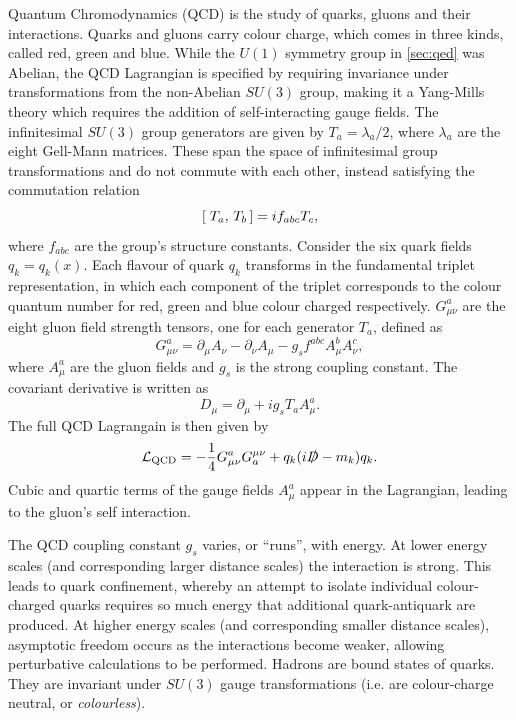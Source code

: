 Quantum Chromodynamics (QCD) is the study of quarks, gluons and their interactions.
Quarks and gluons carry colour charge, which comes in three kinds, called red, green and blue.
While the $U(1)$ symmetry group in \cref{sec:qed} was Abelian, the QCD Lagrangian is specified by requiring invariance under transformations from the non-Abelian $SU(3)$ group, making it a Yang\nobreakdash-Mills theory \cite{PhysRev.96.191} which requires the addition of self-interacting gauge fields.
The infinitesimal $SU(3)$ group generators are given by $T_a = \lambda_a / 2$, where $\lambda_a$ are the eight Gell\nobreakdash-Mann matrices.
These span the space of infinitesimal group transformations and do not commute with each other, instead satisfying the commutation relation
%
\begin{equation}
  [\; T_a,\,T_b\,] = i f_{abc} T_c ,
\end{equation}
%
where $f_{abc}$ are the group's structure constants.
Consider the six quark fields $q_k = q_k(x)$.
Each flavour of quark $q_k$ transforms in the fundamental triplet representation, in which each component of the triplet corresponds to the colour quantum number for red, green and blue colour charged respectively.
$G^{a}_{\mu\nu}$ are the eight gluon field strength tensors, one for each generator $T_a$, defined as
%
\begin{equation}\label{eq:qcd_field_strength_tensor}
  G^a_{\mu\nu} = \partial_\mu A_\nu - \partial_\nu A_\mu - g_s f^{abc} A_\mu^b A_\nu^c ,
\end{equation}
%
where $A_\mu^a$ are the gluon fields and $g_s$ is the strong coupling constant. The covariant derivative is written as
%
\begin{equation}\label{eq:qcd_covariant_derivative}
  D_\mu = \partial_\mu + i g_s T_a A_\mu^a .
\end{equation}
%
The full QCD Lagrangain is then given by
%
\begin{equation}\label{eq:qcd_lagrangian}
  \mathcal{L}_\textnormal{QCD} = 
  - \frac{1}{4} G^{a}_{\mu\nu} G_{a}^{\mu\nu}
  + q_k (i \slashed{D} - m_k) q_k .
\end{equation}
%
Cubic and quartic terms of the gauge fields $A^a_\mu$ appear in the Lagrangian, leading to the gluon's self interaction.

The QCD coupling constant $g_s$ varies, or ``runs'', with energy.
At lower energy scales (and corresponding larger distance scales) the interaction is strong.
This leads to quark confinement, whereby an attempt to isolate individual colour-charged quarks requires so much energy that additional quark-antiquark are produced.
At higher energy scales (and corresponding smaller distance scales), asymptotic freedom occurs as the interactions become weaker, allowing perturbative calculations to be performed.
Hadrons are bound states of quarks.
They are invariant under $SU(3)$ gauge transformations (i.e. are colour-charge neutral, or \textit{colourless}).



